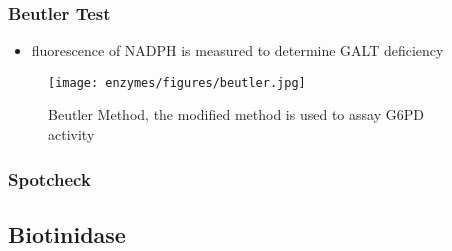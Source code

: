 \documentclass[12pt]{scrartcl}
\begin{document}
\subsubsection{Beutler Test}
\label{sec:org04b528b}

\begin{center}

\vspace{20}


\vspace{20}


\vspace{20}

\end{center}

\begin{itemize}
\item fluorescence of NADPH is measured to determine GALT deficiency
\end{itemize}

\begin{figure}[htbp]
\centering
\texttt{[image: enzymes/figures/beutler.jpg]}
\caption{\label{fig:org49cd7ff}Beutler Method, the modified method is used to assay G6PD activity}
\end{figure}


\subsubsection{Spotcheck}
\label{sec:orgee20bf8}

\begin{center}

\vspace{20}


\vspace{20}


\vspace{20}

\end{center}

\subsection{Biotinidase}
\label{sec:org785baeb}
\end{document}
